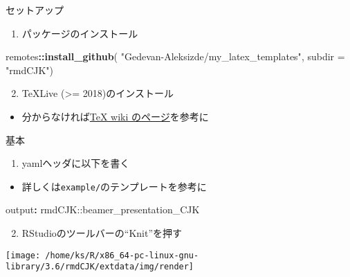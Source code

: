 \documentclass[
  12pt,
  ignorenonframetext,
]{beamer}
\newenvironment{Shaded}{\begin{snugshade}}{\end{snugshade}}
\newcommand{\AttributeTok}[1]{\textcolor[rgb]{0.77,0.63,0.00}{#1}}
\newcommand{\DataTypeTok}[1]{\textcolor[rgb]{0.13,0.29,0.53}{#1}}
\newcommand{\FunctionTok}[1]{\textcolor[rgb]{0.00,0.00,0.00}{#1}}
\newcommand{\KeywordTok}[1]{\textcolor[rgb]{0.13,0.29,0.53}{\textbf{#1}}}
\newcommand{\NormalTok}[1]{#1}
\newcommand{\OperatorTok}[1]{\textcolor[rgb]{0.81,0.36,0.00}{\textbf{#1}}}
\newcommand{\StringTok}[1]{\textcolor[rgb]{0.31,0.60,0.02}{#1}}
\providecommand{\tightlist}{%
  \setlength{\itemsep}{0pt}\setlength{\parskip}{0pt}}
\begin{document}
\begin{frame}[fragile]{セットアップ}
\protect\hypertarget{ux30bbux30c3ux30c8ux30a2ux30c3ux30d7}{}

\begin{enumerate}
\tightlist
\item
  パッケージのインストール
\end{enumerate}

\begin{Shaded}
\begin{Highlighting}[]
\NormalTok{remotes}\OperatorTok{::}\KeywordTok{install_github}\NormalTok{(}
  \StringTok{"Gedevan-Aleksizde/my_latex_templates"}\NormalTok{,}
  \DataTypeTok{subdir =} \StringTok{"rmdCJK"}\NormalTok{)}
\end{Highlighting}
\end{Shaded}

\begin{enumerate}
\setcounter{enumi}{1}
\tightlist
\item
  TeXLive (\textgreater= 2018)のインストール
\end{enumerate}

\begin{itemize}
\tightlist
\item
  分からなければ\href{https://texwiki.texjp.org/?TeX\%20Live}{TeX wiki
  のページ}を参考に
\end{itemize}

\end{frame}

\begin{frame}[fragile]{基本}
\protect\hypertarget{ux57faux672c}{}

\begin{enumerate}
\tightlist
\item
  yamlヘッダに以下を書く
\end{enumerate}

\begin{itemize}
\tightlist
\item
  詳しくは\texttt{example/}のテンプレートを参考に
\end{itemize}

\begin{Shaded}
\begin{Highlighting}[]
\FunctionTok{output}\KeywordTok{:}\AttributeTok{ rmdCJK::beamer_presentation_CJK}
\end{Highlighting}
\end{Shaded}

\begin{enumerate}
\setcounter{enumi}{1}
\tightlist
\item
  RStudioのツールバーの``Knit''を押す
\end{enumerate}

\begin{center}\texttt{[image: /home/ks/R/x86\_64-pc-linux-gnu-library/3.6/rmdCJK/extdata/img/render]} \end{center}

\end{frame}
\end{document}
